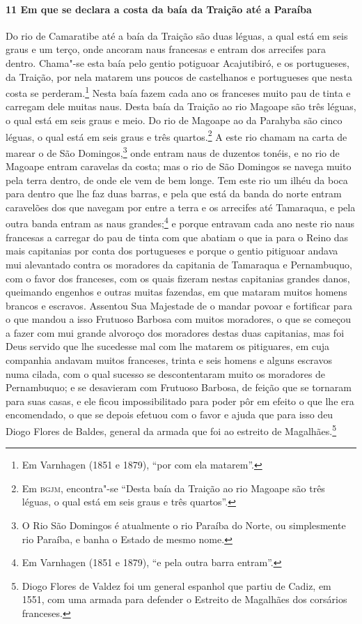 \begin{linenumbers}
\paragraph{11 Em que se declara a costa da baía da Traição até a Paraíba} \quad
Do rio de Camaratibe até a baía da Traição são duas léguas, a qual está em seis graus e um
terço, onde ancoram naus francesas e entram dos arrecifes para dentro. Chama"-se esta baía
pelo gentio potiguoar Acajutibiró, e os portugueses, da Traição, por nela matarem uns
poucos de castelhanos e portugueses que nesta costa se perderam.\footnote{ Em Varnhagen
(1851 e 1879), ``por com ela matarem''.} Nesta baía fazem cada ano os franceses muito pau
de tinta e carregam dele muitas naus. Desta baía da Traição ao rio Magoape são três
léguas, o qual está em seis graus e meio. Do rio de Magoape ao da Parahyba são cinco
léguas, o qual está em seis graus e três quartos.\footnote{ Em \textsc{bgjm}, encontra"-se
``Desta baía da Traição ao rio Magoape são três léguas, o qual está em seis graus e três
quartos''.} A este rio chamam na carta de marear o de São Domingos,\footnote{ O Rio São
Domingos é atualmente o rio Paraíba do Norte, ou simplesmente rio Paraíba, e banha o
Estado de mesmo nome.} onde entram naus de duzentos tonéis, e no rio de Magoape entram
caravelas da costa; mas o rio de São Domingos se navega muito pela terra dentro, de onde
ele vem de bem longe. Tem este rio um ilhéu da boca para dentro que lhe faz duas barras, e
pela que está da banda do norte entram caravelões dos que navegam por entre a terra e os
arrecifes até Tamaraqua, e pela outra banda entram as naus grandes;\footnote{ Em Varnhagen
(1851 e 1879), ``e pela outra barra entram''.} e porque entravam cada ano neste rio naus
francesas a carregar do pau de tinta com que abatiam o que ia para o Reino das mais
capitanias por conta dos portugueses e porque o gentio pitiguoar andava mui alevantado
contra os moradores da capitania de Tamaraqua e Pernambuquo, com o favor dos franceses,
com os quais fizeram nestas capitanias grandes danos, queimando engenhos e outras muitas
fazendas, em que mataram muitos homens brancos e escravos. Assentou Sua Majestade de o
mandar povoar e fortificar para o que mandou a isso Frutuoso Barbosa com muitos moradores,
o que se começou a fazer com mui grande alvoroço dos moradores destas duas capitanias, mas
foi Deus servido que lhe sucedesse mal com lhe matarem os pitiguares, em cuja companhia
andavam muitos franceses, trinta e seis homens e alguns escravos numa cilada, com o qual
sucesso se descontentaram muito os moradores de Pernambuquo; e se desavieram com Frutuoso
Barbosa, de feição que se tornaram para suas casas, e ele ficou impossibilitado para poder
pôr em efeito o que lhe era encomendado, o que se depois efetuou com o favor e ajuda que
para isso deu Diogo Flores de Baldes, general da armada que foi ao estreito de
Magalhães.\footnote{ Diogo Flores de Valdez foi um general espanhol que partiu de Cadiz,
em 1551, com uma armada para defender o Estreito de Magalhães dos corsários franceses.}


\end{linenumbers}
